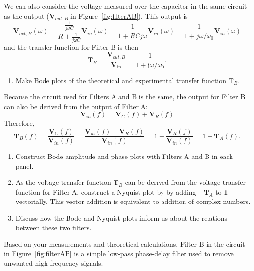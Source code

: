 \documentclass{article}
\begin{document}
We can also consider the voltage measured over the capacitor in the
same circuit as the output ($\mathbf{V}_{out, B}$ in
Figure~\ref{fig:filterAB}).  This output is
\begin{equation}
  \mathbf{V}_{out, B}(\omega)={\frac {\frac {1}{j\omega C}}{R+{\frac {1}{j\omega C}}}}\mathbf{V}_{in}(\omega)={\frac {1}{1+RCj\omega}}\mathbf{V}_{in}(\omega) =
  {\frac {1}{1+j\omega/\omega_0}}\mathbf{V}_{in}(\omega)
\end{equation}
and the transfer function for Filter B is then
\begin{equation}
  \mathbf{T}_B =
  \frac{\mathbf{V}_{out, B}}{\mathbf{V}_{in}}=
  \frac{1}{1+\mathrm{j}\omega/\omega_0}.
\end{equation}
\begin{enumerate}
\item Make Bode plots of the theoretical and experimental transfer
  function $\mathbf{T}_B$.
\end{enumerate}

Because the circuit used for Filters A and B is the same, the output for
Filter B can also be derived from the output of Filter A:
\begin{equation}
  \mathbf{V}_{in}(f)=\mathbf{V}_C(f)+\mathbf{V}_R(f)
\end{equation}
Therefore,
\begin{equation}
  \mathbf{T}_B(f) =\frac{\mathbf{V}_C(f)}{\mathbf{V}_{in}(f)}
  =\frac{\mathbf{V}_{in}(f)-\mathbf{V}_R(f)}{\mathbf{V}_{in}(f)}
  =1-\frac{\mathbf{V}_R(f)}{\mathbf{V}_{in}(f)}
  =1-\mathbf{T}_A(f).
\end{equation}

\begin{enumerate}
\item Construct Bode amplitude and phase plots with Filters A and B in
  each panel.
\item As the voltage transfer function $\mathbf{T}_B$ can be derived
  from the voltage transfer function for Filter A, construct a Nyquist
  plot by by adding $-\mathbf{T}_A$ to $\mathbf{1}$ vectorially. This
  vector addition is equivalent to addition of complex numbers.
\item Discuss how the Bode and Nyquist plots inform us about the relations
  between these two filters.
\end{enumerate}
Based on your measurements and theoretical calculations, Filter B in
the circuit in Figure~\ref{fig:filterAB} is a simple low-pass
phase-delay filter used to remove unwanted high-frequency signals.
\end{document}
